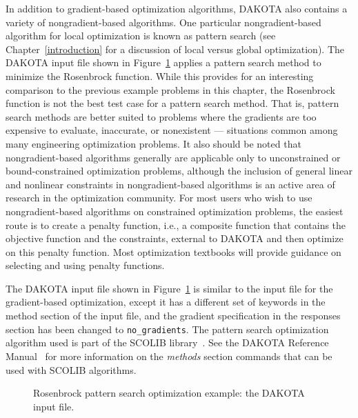 In addition to gradient-based optimization algorithms, DAKOTA also
contains a variety of nongradient-based algorithms. One particular
nongradient-based algorithm for local optimization is known as pattern
search (see Chapter~\ref{introduction} for a discussion of local
versus global optimization). The DAKOTA input file shown in
Figure~\ref{tutorial:rosenbrock_patternsearch} applies a pattern
search method to minimize the Rosenbrock function.  While this
provides for an interesting comparison to the previous example
problems in this chapter, the Rosenbrock function is not the best test
case for a pattern search method. That is, pattern search methods are
better suited to problems where the gradients are too expensive to
evaluate, inaccurate, or nonexistent --- situations common among many
engineering optimization problems. It also should be noted that
nongradient-based algorithms generally are applicable only to
unconstrained or bound-constrained optimization problems, although the
inclusion of general linear and nonlinear constraints in
nongradient-based algorithms is an active area of research in the
optimization community. For most users who wish to use
nongradient-based algorithms on constrained optimization problems, the
easiest route is to create a penalty function, i.e., a composite
function that contains the objective function and the constraints,
external to DAKOTA and then optimize on this penalty function. Most
optimization textbooks will provide guidance on selecting and using
penalty functions.

The DAKOTA input file shown in
Figure~\ref{tutorial:rosenbrock_patternsearch} is similar to the
input file for the gradient-based optimization, except it has a
different set of keywords in the method section of the input file, and
the gradient specification in the responses section has been changed
to \texttt{no\_gradients}. The pattern search optimization algorithm
used is part of the SCOLIB library~\cite{Har06}.  See the DAKOTA
Reference Manual~\cite{RefMan} for more information on the
\emph{methods} section commands that can be used with SCOLIB
algorithms.

\begin{figure}[ht!]
  \centering
  \begin{bigbox}
    \begin{small}
    \end{small}
  \end{bigbox}
  \caption{Rosenbrock pattern search optimization example: the DAKOTA input file.}
  \label{tutorial:rosenbrock_patternsearch}
\end{figure}

